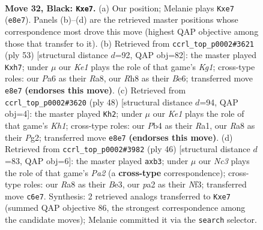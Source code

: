 \documentclass[11pt]{article}
\begin{document}
\clearpage

\begin{figure}[p]\centering
\begin{subfigure}{0.46\textwidth}\centering
\resizebox{\linewidth}{!}{%
\newchessgame
\chessboard[
  setfen={r3k2r/4Q1bp/p1np2p1/4p1P1/1p2P2P/5P1B/PPPK1B2/R1R5 b - - 0 32},
  showmover=false,
  pgfstyle=straightmove, color=movearrow, markmove={e8-e7}
]}
\caption{}
\end{subfigure}\hfill
\begin{subfigure}{0.46\textwidth}\centering
\resizebox{\linewidth}{!}{%
\newchessgame
\chessboard[
  setfen={r3r1k1/pp5Q/4b1p1/nP1p1pP1/P2B4/6R1/2P3PP/5RK1 b - - 0 27},
  showmover=false,
  pgfstyle=straightmove, color=movearrow, markmove={g8-h7}
]}
\caption{}
\end{subfigure}
\\[4pt]
\begin{subfigure}{0.46\textwidth}\centering
\resizebox{\linewidth}{!}{%
\newchessgame
\chessboard[
  setfen={r1r1b1k1/1p3pp1/p3p2p/4P3/1PqN1P1P/PQ6/2P3P1/R2R3K w - - 1 25},
  showmover=false,
  pgfstyle=straightmove, color=movearrow, markmove={h1-h2}
]}
\caption{}
\end{subfigure}\hfill
\begin{subfigure}{0.46\textwidth}\centering
\resizebox{\linewidth}{!}{%
\newchessgame
\chessboard[
  setfen={r1r2bk1/2pRp2p/p5p1/4Pp2/4nP1P/1q2BN2/PP4P1/R5K1 w - - 0 24},
  showmover=false,
  pgfstyle=straightmove, color=movearrow, markmove={a2-b3}
]}
\caption{}
\end{subfigure}
\caption{\textbf{Move 32, Black: \texttt{Kxe7}.} (a) Our position; Melanie plays \texttt{Kxe7} (\texttt{e8e7}). Panels (b)--(d) are the retrieved master positions whose correspondence most drove this move (highest QAP objective among those that transfer to it). (b) Retrieved from \texttt{ccrl\_top\_p0002\#3621} (ply 53) [structural distance $d$=92, QAP obj=82]: the master played \texttt{Kxh7}; under $\mu$ our \emph{Ke1} plays the role of that game's \emph{Kg1}; cross-type roles: our \emph{P}a6 as their \emph{R}a8, our \emph{R}h8 as their \emph{B}e6; transferred move \texttt{e8e7} \textbf{(endorses this move)}. (c) Retrieved from \texttt{ccrl\_top\_p0002\#3620} (ply 48) [structural distance $d$=94, QAP obj=4]: the master played \texttt{Kh2}; under $\mu$ our \emph{Ke1} plays the role of that game's \emph{Kh1}; cross-type roles: our \emph{P}b4 as their \emph{R}a1, our \emph{R}a8 as their \emph{P}g2; transferred move \texttt{e8e7} \textbf{(endorses this move)}. (d) Retrieved from \texttt{ccrl\_top\_p0002\#3982} (ply 46) [structural distance $d$=83, QAP obj=6]: the master played \texttt{axb3}; under $\mu$ our \emph{Nc3} plays the role of that game's \emph{Pa2} (a \textbf{cross-type} correspondence); cross-type roles: our \emph{R}a8 as their \emph{B}e3, our \emph{p}a2 as their \emph{N}f3; transferred move \texttt{c6e7}. Synthesis: 2 retrieved analogs transferred to \texttt{Kxe7} (summed QAP objective 86, the strongest correspondence among the candidate moves); Melanie committed it via the \texttt{search} selector.}
\label{fig:thought-m63}
\end{figure}
\end{document}
